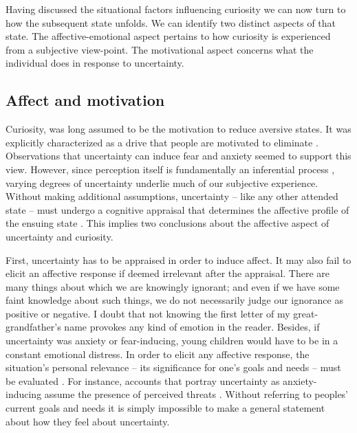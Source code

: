 

Having discussed the situational factors influencing curiosity we can now turn to how the subsequent state unfolds. We can identify two distinct aspects of that state. The affective-emotional aspect pertains to how curiosity is experienced from a subjective view-point. The motivational aspect concerns what the individual does in response to uncertainty.

\subsection{Affect and motivation} 

Curiosity, was long assumed to be the motivation to reduce aversive states. It was explicitly characterized as a drive that people are motivated to eliminate \cite{berlyne_theory_1954,loewenstein_psychology_1994}. Observations that uncertainty can induce fear and anxiety \cite{hebb_organization_2002,carleton_fear_2016} seemed to support this view. However, since perception itself is fundamentally an inferential process \cite{olshausen_perception_2013,friston_active_2016}, varying degrees of uncertainty underlie much of our subjective experience. Without making additional assumptions, uncertainty --  like any other attended state -- must undergo a cognitive appraisal that determines the affective profile of the ensuing state \cite{anderson_relationship_2019}. This implies two conclusions about the affective aspect of uncertainty and curiosity.

First, uncertainty has to be appraised in order to induce affect. It may also fail to elicit an affective response if deemed irrelevant after the appraisal. There are many things about which we are knowingly ignorant; and even if we have some faint knowledge about such things, we do not necessarily judge our ignorance as positive or negative. I doubt that not knowing the first letter of my great-grandfather's name provokes any kind of emotion in the reader. Besides, if uncertainty was anxiety or fear-inducing, young children would have to be in a constant emotional distress. In order to elicit any affective response, the situation's personal relevance -- its significance for one's goals and needs -- must be evaluated \cite{lazarus_progress_1991,cunningham_motivational_2012}. For instance, accounts that portray uncertainty as anxiety-inducing assume the presence of perceived threats \cite{grupe_uncertainty_2013}. Without referring to peoples' current goals and needs it is simply impossible to make a general statement about how they feel about uncertainty.


